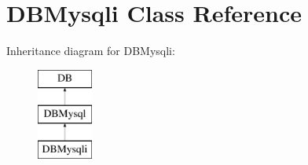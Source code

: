 \hypertarget{classDBMysqli}{}\section{D\+B\+Mysqli Class Reference}
\label{classDBMysqli}
Inheritance diagram for D\+B\+Mysqli\+:\begin{figure}[H]
\begin{center}
\leavevmode
\includegraphics[height=3.000000cm]{classDBMysqli}
\end{center}
\end{figure}
